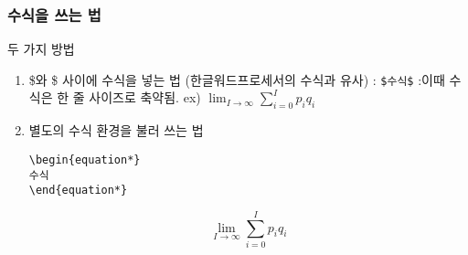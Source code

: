 \documentclass{beamer}
\begin{document}
\begin{frame}[fragile]
\frametitle{{ 수식을 쓰는 법}}
\begin{block}{두 가지 방법}

\begin{enumerate}[{방법}1.]
\item <1>\$와 \$ 사이에 수식을 넣는 법 (한글워드프로세서의 수식과 유사) : \verb!$수식$! :이때 수식은 한 줄 사이즈로 축약됨. ex) $\lim_{I\rightarrow\infty}\sum_{i=0}^{I}p_{i}q_{i}$
\item <2>별도의 수식 환경을 불러 쓰는 법 
\begin{block}{}
	\begin{center}
	\begin{verbatim}
\begin{equation*}
수식
\end{equation*}
	\end{verbatim}
	\end{center}
	
\begin{equation*}
\lim_{I\rightarrow\infty}\sum_{i=0}^{I}p_{i}q_{i}
\end{equation*}
\end{block}
\end{enumerate}

\end{block}


\end{frame}


\end{document}
